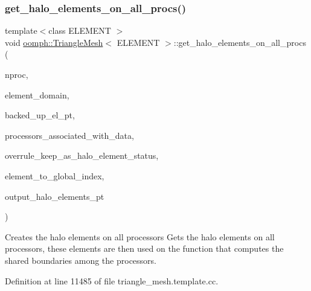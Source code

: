 \mbox{\label{classoomph_1_1TriangleMesh_a30672c4e1beac8a4db1c7e01a1d610a9}} 
\subsubsection{\texorpdfstring{get\+\_\+halo\+\_\+elements\+\_\+on\+\_\+all\+\_\+procs()}{get\_halo\_elements\_on\_all\_procs()}}
{\footnotesize\ttfamily template$<$class E\+L\+E\+M\+E\+NT $>$ \\
void \hyperlink{classoomph_1_1TriangleMesh}{oomph\+::\+Triangle\+Mesh}$<$ E\+L\+E\+M\+E\+NT $>$\+::get\+\_\+halo\+\_\+elements\+\_\+on\+\_\+all\+\_\+procs (\begin{DoxyParamCaption}\item[{const unsigned \&}]{nproc,  }\item[{const Vector$<$ unsigned $>$ \&}]{element\+\_\+domain,  }\item[{const Vector$<$ Generalised\+Element $\ast$$>$ \&}]{backed\+\_\+up\+\_\+el\+\_\+pt,  }\item[{std\+::map$<$ Data $\ast$, std\+::set$<$ unsigned $>$ $>$ \&}]{processors\+\_\+associated\+\_\+with\+\_\+data,  }\item[{const bool \&}]{overrule\+\_\+keep\+\_\+as\+\_\+halo\+\_\+element\+\_\+status,  }\item[{std\+::map$<$ Generalised\+Element $\ast$, unsigned $>$ \&}]{element\+\_\+to\+\_\+global\+\_\+index,  }\item[{Vector$<$ Vector$<$ Vector$<$ Generalised\+Element $\ast$$>$ $>$ $>$ \&}]{output\+\_\+halo\+\_\+elements\+\_\+pt }\end{DoxyParamCaption})\hspace{0.3cm}{\ttfamily [protected]}}



Creates the halo elements on all processors Gets the halo elements on all processors, these elements are then used on the function that computes the shared boundaries among the processors. 



Definition at line 11485 of file triangle\+\_\+mesh.\+template.\+cc.

